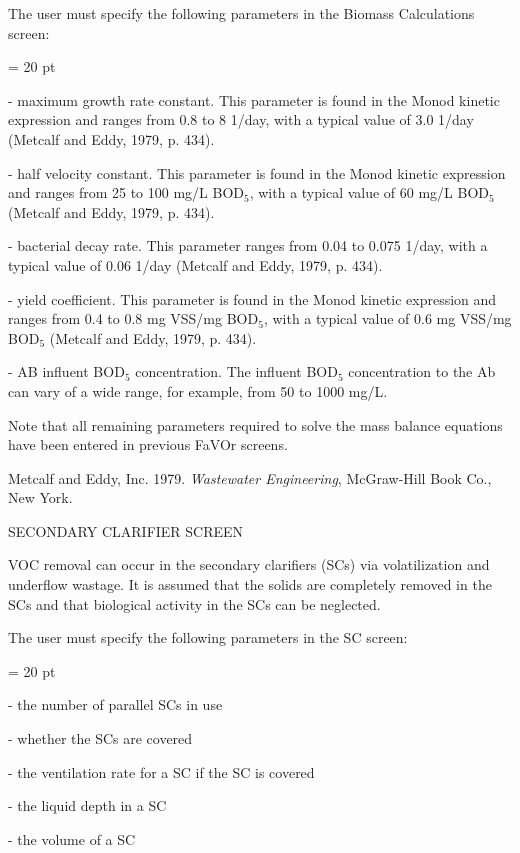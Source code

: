 The user must specify the following parameters in the Biomass Calculations
screen:

{\parindent = 20 pt

\item{-} maximum growth rate constant. This parameter is found in the Monod
kinetic expression and ranges from 0.8 to 8 1/day, with a typical value of 3.0
1/day (Metcalf and Eddy, 1979, p. 434).

\item{-} half velocity constant.  This parameter is found in the Monod kinetic
expression and ranges from 25 to 100 mg/L BOD$_5$, with a typical value of 60
mg/L BOD$_5$ (Metcalf and Eddy, 1979, p. 434).

\item{-} bacterial decay rate.  This parameter ranges from 0.04 to 0.075 1/day,
with a typical value of 0.06 1/day (Metcalf and Eddy, 1979, p. 434).

\item{-} yield coefficient.  This parameter is found in the Monod kinetic
expression and ranges from 0.4 to 0.8 mg VSS/mg BOD$_5$, with a typical value
of 0.6 mg VSS/mg BOD$_5$ (Metcalf and Eddy, 1979, p. 434).

\item{-} AB influent BOD$_5$ concentration.  The influent BOD$_5$ concentration
to the Ab can vary of a wide range, for example, from 50 to 1000 mg/L.

}

Note that all remaining parameters required to solve the mass balance equations
have been entered in previous FaVOr screens.


Metcalf and Eddy, Inc. 1979. {\it Wastewater Engineering}, McGraw-Hill Book
Co., New York.




\newpage

SECONDARY CLARIFIER SCREEN

VOC removal can occur in the secondary clarifiers (SCs) via volatilization and
underflow wastage.  It is assumed that the solids are completely removed in the
SCs and that biological activity in the SCs can be neglected.

The user must specify the following parameters in the SC screen:

{\parindent = 20 pt

\item{-} the number of parallel SCs in use

\item{-} whether the SCs are covered 

\item{-} the ventilation rate for a SC if the SC is covered

\item{-} the liquid depth in a SC

\item{-} the volume of a SC

}

